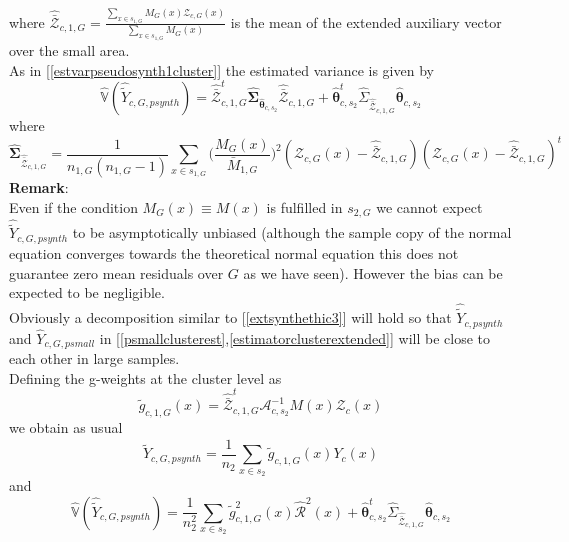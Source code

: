 \documentclass[a4paper,12pt,leqno, titlepage]{article}
\newcommand{\VAR}{\mathbb{V}}
\begin{document}
where
$\hat{\bar{\pmb{\mathcal{Z}}}}_{c,1,G}=\frac{\sum_{x\in{s_{1,G}}}M_G(x)\pmb{\mathcal{Z}}_{c,G}(x)}
{\sum_{x\in{s_{1,G}}}M_G(x)}$
is the mean of the extended auxiliary vector over the small area.\\
As in [\ref{estvarpseudosynth1cluster}] the estimated variance is given by
\begin{equation}\label{estvarpsynth1clusterextended}
\hat{\VAR}(\hat{\tilde{Y}}_{c,G,psynth})=
\hat{\bar{\pmb{\mathcal{Z}}}}_{c,1,G}^t\hat{\pmb{\Sigma}}_{\hat{\pmb{\theta}}_{c,s_2}}
\hat{\bar{\pmb{\mathcal{Z}}}}_{c,1,G}
+ \hat{\pmb{\theta}}_{c,s_2}^t\hat{\Sigma}_{\hat{\bar{\pmb{\mathcal{Z}}}}_{c,1,G}}\hat{\pmb{\theta}}_{c,s_2}
\end{equation}
\noindent where
\begin{equation}\label{estcovauxiliaryclusterextended}
\hat{\pmb{\Sigma}}_{\hat{\bar{\pmb{\mathcal{Z}}}}_{c,1,G}}=\frac{1}{n_{1,G}(n_{1,G}-1)}
\sum_{x\in{s_{1,G}}}\big(\frac{M_G(x)}{\bar{M}_{1,G}}\big)^2(\pmb{\mathcal{Z}}_{c,G}(x)-
\hat{\bar{\pmb{\mathcal{Z}}}}_{c,1,G})
(\pmb{\mathcal{Z}}_{c,G}(x)-\hat{\bar{\pmb{\mathcal{Z}}}}_{c,1,G})^t
\end{equation}
\textbf{Remark}:\\
Even if the condition $M_G(x)\equiv M(x)$ is fulfilled in $s_{2,G}$ we cannot expect $\hat{\tilde{Y}}_{c,G,psynth}$ to be asymptotically unbiased (although the sample copy of the normal equation converges towards the theoretical normal equation this does not guarantee zero mean residuals over $G$ as we have seen). However the bias can be expected to be negligible.\\[0.5cm]
Obviously a decomposition similar to [\ref{extsynthethic3}] will hold so that $\hat{\tilde{Y}}_{c,psynth}$ and $\hat{Y}_{c,G,psmall}$ in [\ref{psmallclusterest},\ref{estimatorclusterextended}]
will be close to each other in large samples.\\
Defining the g-weights at the cluster level as
\begin{equation}
\tilde{g}_{c,1,G}(x)=\hat{\bar{\pmb{\mathcal{Z}}}}^t_{c,1,G}\pmb{\mathcal{A}}^{-1}_{c,s_2}M(x)
\pmb{\mathcal{Z}}_c(x)
\end{equation}
we obtain as usual
\begin{equation}\label{gweightclusterpointestextended}
\hat{\tilde{Y}}_{c,G,psynth}=\frac{1}{n_2}\sum_{x\in{s_2}}\tilde{g}_{c,1,G}(x)Y_c(x)
\end{equation}
and
\begin{equation}\label{gweightclustervarestextended}
\hat{\VAR}(\hat{\tilde{Y}}_{c,G,psynth})=\frac{1}{n_2^2}\sum_{x\in{s_2}}
\tilde{g}^2_{c,1,G}(x)\hat{\mathcal{R}}^2(x)+
\hat{\pmb{\theta}}_{c,s_2}^t\hat{\Sigma}_{\hat{\bar{\pmb{\mathcal{Z}}}}_{c,1,G}}\hat{\pmb{\theta}}_{c,s_2}
\end{equation}
\end{document}
